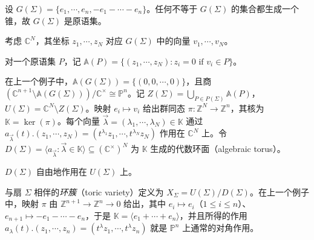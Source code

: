 \begin{example*}
设 $G(\Sigma)=\{e_1,\dotsb,e_n,-e_1-\dotsb-e_n\}$。任何不等于 $G(\Sigma)$ 的集合都生成一个锥，故 $G(\Sigma)$ 是原语集。
\end{example*}

考虑 $\mathbb{C}^N$，其坐标 $z_1,\dotsb, z_N$ 对应 $G(\Sigma)$ 中的向量 $v_1,\dotsb, v_N$。

\begin{definition*}
对一个原语集 $P$，记 $\mathbb{A}(P)=\{(z_1,\dotsb, z_N)\colon z_i=0\text{ if }v_i\in P\}$。
\end{definition*}


在上一个例子中，$\mathbb{A} (G(\Sigma))=\{(0,0,\dotsb, 0)\}$，且商 $\left(\mathbb{C}^{n+1}\setminus\mathbb{A} (G(\Sigma))\right)\big/\mathbb{C}^{\times}\cong\mathbb{P}^n$。记 $Z(\Sigma)=\displaystyle\bigcup_{P\in P(\Sigma)}\mathbb{A}(P)$，$U(\Sigma)=\mathbb{C}^N\setminus Z(\Sigma)$。映射 $e_i\mapsto v_i$ 给出群同态 $\pi\colon\mathbb{Z}^N\to\mathbb{Z}^n$，其核为 $\mathbb{K}=\ker (\pi)$。每个向量 $\vec{\lambda} =(\lambda_1,\dotsb,\lambda_N)\in\mathbb{K}$ 通过 $a_{\vec{\lambda}}(t).(z_1,\dotsb, z_N)=(t^{\lambda_1}z_1,\dotsb, t^{\lambda_N}z_N)$ 作用在 $\mathbb{C}^N$ 上。令 $D(\Sigma)=\langle a_{\vec{\lambda}}\colon\vec{\lambda}\in\mathbb{K}\rangle\subseteq\left(\mathbb{C}^{\times}\right)^N$ 为 $\mathbb{K}$ 生成的代数环面（algebraic torus）。

\begin{lemma*}
$D(\Sigma)$ 自由地作用在 $U(\Sigma)$ 上。
\end{lemma*}

与扇 $\Sigma$ 相伴的\emph{环簇}（toric variety）定义为 $X_{\Sigma}=U(\Sigma)/D(\Sigma)$。在上一个例子中，映射 $\pi$ 由 $\mathbb{Z}^{n+1}\to\mathbb{Z}^n\to 0$ 给出，其中 $e_i\mapsto e_i$（$1\leq i\leq n$）、$e_{n+1}\mapsto -e_1-\dotsb -e_n$，于是 $\mathbb{K} =\langle e_1+\dotsb +e_n\rangle$，并且所得的作用 $a_{\lambda}(t).(z_1,\dotsb, z_n)=(t^{\lambda}z_1,\dotsb, t^{\lambda}z_n)$ 就是 $\mathbb{P}^n$ 上通常的对角作用。


